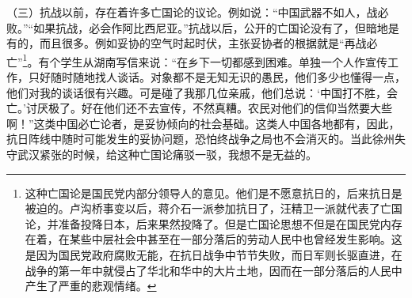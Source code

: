 \documentclass[UTF8, 12pt, a4paper]{ctexrep}
\begin{document}
（三）抗战以前，存在着许多亡国论的议论。例如说：“中国武器不如人，战必败。”“如果抗战，必会作阿比西尼亚。”抗战以后，公开的亡国论没有了，但暗地是有的，而且很多。例如妥协的空气时起时伏，主张妥协者的根据就是“再战必亡”\footnote{这种亡国论是国民党内部分领导人的意见。他们是不愿意抗日的，后来抗日是被迫的。卢沟桥事变以后，蒋介石一派参加抗日了，汪精卫一派就代表了亡国论，并准备投降日本，后来果然投降了。但是亡国论思想不但是在国民党内存在着，在某些中层社会中甚至在一部分落后的劳动人民中也曾经发生影响。这是因为国民党政府腐败无能，在抗日战争中节节失败，而日军则长驱直进，在战争的第一年中就侵占了华北和华中的大片土地，因而在一部分落后的人民中产生了严重的悲观情绪。}。有个学生从湖南写信来说：“在乡下一切都感到困难。单独一个人作宣传工作，只好随时随地找人谈话。对象都不是无知无识的愚民，他们多少也懂得一点，他们对我的谈话很有兴趣。可是碰了我那几位亲戚，他们总说：‘中国打不胜，会亡。’讨厌极了。好在他们还不去宣传，不然真糟。农民对他们的信仰当然要大些啊！”这类中国必亡论者，是妥协倾向的社会基础。这类人中国各地都有，因此，抗日阵线中随时可能发生的妥协问题，恐怕终战争之局也不会消灭的。当此徐州失守武汉紧张的时候，给这种亡国论痛驳一驳，我想不是无益的。
\end{document}
